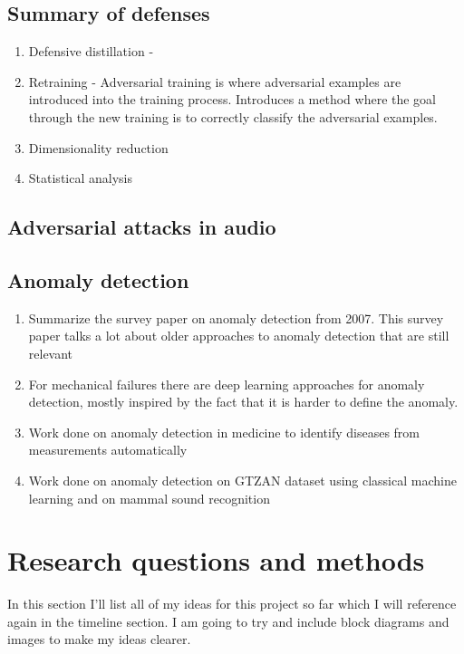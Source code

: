 \documentclass[journal,onecolumn]{IEEEtran}
\begin{document}
\subsection{Summary of defenses}

\begin{enumerate}
\item Defensive distillation - 
\item Retraining - Adversarial training is where adversarial examples are introduced into the training process. Introduces a method where the goal through the new training is to correctly classify the adversarial examples. 
\item Dimensionality reduction
\item Statistical analysis
\end{enumerate}

\subsection{Adversarial attacks in audio}

\subsection{Anomaly detection}
\begin{enumerate}
\item Summarize the survey paper on anomaly detection from 2007. This survey paper talks a lot about older approaches to anomaly detection that are still relevant

\item For mechanical failures there are deep learning approaches for anomaly detection, mostly inspired by the fact that it is harder to define the anomaly. 

\item Work done on anomaly detection in medicine to identify diseases from measurements automatically

\item Work done on anomaly detection on GTZAN dataset using classical machine learning and on mammal sound recognition
\end{enumerate}




\section{Research questions and methods}

In this section I'll list all of my ideas for this project so far which I will reference again in the timeline section. I am going to try and include block diagrams and images to make my ideas clearer.
\end{document}
